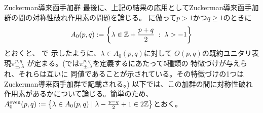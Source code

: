 \documentclass[notheorems]{beamer}
\newcommand{\nin}{\not\in}
\theoremstyle{definition}
\theoremstyle{example}
\theoremstyle{remark}
\theoremstyle{mystyle}
\begin{document}
\begin{frame}{Zuckerman導来函手加群}
	最後に、上記の結果の応用としてZuckerman導来函手加群の間の対称性破れ作用素の問題を論じる。
	\cite[(5.1.1)]{KO2}に{倣}って$p>1${かつ}$q\ge1$のときに\begin{equation*}
	A_0(p,q):=\left\{ \lambda\in\mathbb{Z}+\frac{p+q}{2}\;:\;\lambda>-1 \right\}
\end{equation*}とおくと、
\cite{KO2}で
示したように、$\lambda\in A_0(p,q)$に対して
$O(p,q)$の既約ユニタリ表現$\pi_{\pm,\lambda}^{p,q}$
が定まる。(\cite{KO2}では$\pi_{\pm,\lambda}^{p,q}$を定義するにあたって5種類の
特徴づけが与えら{れ}、それらは互いに
同値であることが示されている。その特徴づけの1つは
Zuckerman導来函手加群で記載される。)
以下では、この加群の間に対称性破れ作用素がある{か}について論じる。簡単のため、$A_0^{\mbox{\scriptsize even}}(p,q):=\left\{ \lambda\in A_0(p,q)\mid \lambda-\frac{p-q}{2}+1\in2\mathbb{Z} \right\}$とおく。
\end{frame}
\end{document}
